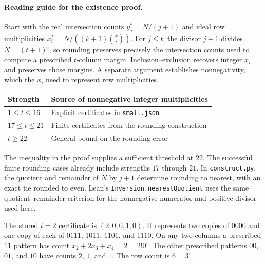 \documentclass[11pt]{article}
\newcommand{\code}[1]{\texttt{#1}}
\begin{document}
\paragraph{Reading guide for the existence proof.}
Start with the real intersection counts \(y_j^*=N/(j+1)\) and
ideal row multiplicities \(x_i^*=N/((k+1)\binom{k}{i})\).
For \(j\le t\), the divisor \(j+1\) divides \(N=(t+1)!\), so
rounding preserves precisely the intersection counts used to compute
a prescribed \(t\)-column margin. Inclusion--exclusion recovers
integer \(x_i\) and preserves those margins. A separate argument
establishes nonnegativity, which the \(x_i\) need to represent row
multiplicities.

\begin{center}
\begin{tabular}{@{}lp{.68\linewidth}@{}}
\toprule
Strength & Source of nonnegative integer multiplicities \\
\midrule
\(1\le t\le16\) & Explicit certificates in \code{small.json} \\
\(17\le t\le21\) & Finite certificates from the rounding construction \\
\(t\ge22\) & General bound on the rounding error \\
\bottomrule
\end{tabular}
\end{center}

The inequality in the proof supplies a sufficient threshold at
\(22\). The successful finite rounding cases already include
strengths \(17\) through \(21\). In \code{construct.py}, the quotient
and remainder of \(N\) by \(j+1\) determine rounding to nearest,
with an exact tie rounded to even. Lean's
\code{Inversion.nearestQuotient} uses the same quotient--remainder
criterion for the nonnegative numerator and positive divisor used here.

The stored \(t=2\) certificate is \((2,0,0,1,0)\).
It represents two copies of \(0000\) and one copy of each of
\(0111\), \(1011\), \(1101\), and \(1110\).
On any two columns a prescribed \(11\) pattern has count
\(x_2+2x_3+x_4=2=2!0!\). The other prescribed patterns \(00\), \(01\),
and \(10\) have counts \(2\), \(1\), and \(1\). The row count is \(6=3!\).
\end{document}

